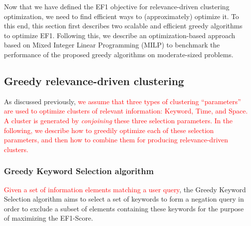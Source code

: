 Now that we have defined the EF1 objective for relevance-driven clustering optimization, we need to find efficient ways to (approximately) optimize it.  To this end, this section first describes two scalable and efficient greedy algorithms to optimize EF1.
Following this, we describe an optimization-based approach based on Mixed Integer Linear Programming (MILP) to benchmark the performance of the proposed greedy algorithms on moderate-sized problems.

\subsection{Greedy relevance-driven clustering}


As discussed previously, \textcolor{red}{we assume that three types of clustering ``parameters'' are used to optimize clusters of relevant information: Keyword, Time, and Space.  A cluster is generated by \emph{conjoining} these three selection parameters. In the following, we describe how to greedily optimize each of these selection parameters, and then how to combine them for producing relevance-driven clusters.}

\subsubsection{Greedy Keyword Selection algorithm}

\textcolor{red}{Given a set of information elements matching a user query}, the Greedy Keyword Selection algorithm aims to select a set of keywords to form a negation query in order to exclude a subset of elements containing these keywords for the purpose of maximizing the EF1-Score.

